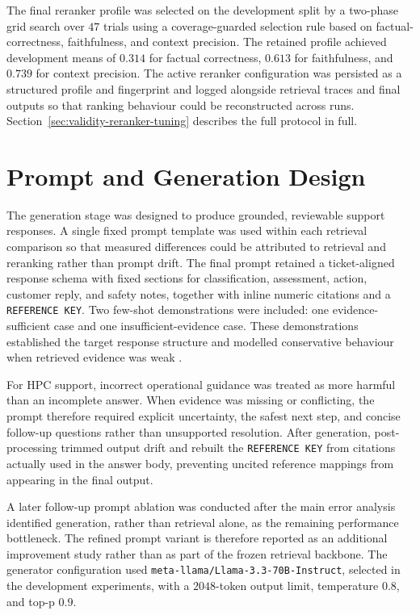 The final reranker profile was selected on the development split by a two-phase grid search over $47$ trials using a coverage-guarded selection rule based on factual-correctness, faithfulness, and context precision. The retained profile achieved development means of $0.314$ for factual correctness, $0.613$ for faithfulness, and $0.739$ for context precision. The active reranker configuration was persisted as a structured profile and fingerprint and logged alongside retrieval traces and final outputs so that ranking behaviour could be reconstructed across runs. Section~\ref{sec:validity-reranker-tuning} describes the full protocol in full. 

\section{Prompt and Generation Design}
\label{sec:prompt-generation-design}

The generation stage was designed to produce grounded, reviewable support responses. A single fixed prompt template was used within each retrieval comparison so that measured differences could be attributed to retrieval and reranking rather than prompt drift. The final prompt retained a ticket-aligned response schema with fixed sections for classification, assessment, action, customer reply, and safety notes, together with inline numeric citations and a \texttt{REFERENCE KEY}. Two few-shot demonstrations were included: one evidence-sufficient case and one insufficient-evidence case. These demonstrations established the target response structure and modelled conservative behaviour when retrieved evidence was weak \citep{brownLanguageModelsAre2020,asaiSelfRAGLearningRetrieve2023,gaoEnablingLargeLanguage2023}.

For \ac{HPC} support, incorrect operational guidance was treated as more harmful than an incomplete answer. When evidence was missing or conflicting, the prompt therefore required explicit uncertainty, the safest next step, and concise follow-up questions rather than unsupported resolution. After generation, post-processing trimmed output drift and rebuilt the \texttt{REFERENCE KEY} from citations actually used in the answer body, preventing uncited reference mappings from appearing in the final output. 

A later follow-up prompt ablation was conducted after the main error analysis identified generation, rather than retrieval alone, as the remaining performance bottleneck. The refined prompt variant is therefore reported as an additional improvement study rather than as part of the frozen retrieval backbone. The generator configuration used \texttt{meta-llama/Llama-3.3-70B-Instruct}, selected in the development experiments, with a $2048$-token output limit, temperature $0.8$, and top-p $0.9$.

